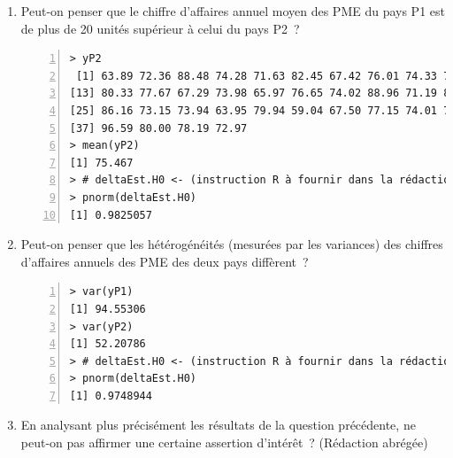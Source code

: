 \documentclass[10pt]{report}
\begin{document}
\begin{exercice}
\begin{enumerate}
\item Peut-on penser que le chiffre d'affaires annuel moyen des PME du pays P1 est de plus de 20 unités supérieur à celui du pays P2~?

\IndicR
\begin{Verbatim}[frame=leftline,fontfamily=tt,fontshape=n,numbers=left]
> yP2
 [1] 63.89 72.36 88.48 74.28 71.63 82.45 67.42 76.01 74.33 77.81 71.67 72.38
[13] 80.33 77.67 67.29 73.98 65.97 76.65 74.02 88.96 71.19 81.90 75.03 80.35
[25] 86.16 73.15 73.94 63.95 79.94 59.04 67.50 77.15 74.01 77.45 78.13 74.46
[37] 96.59 80.00 78.19 72.97
> mean(yP2)
[1] 75.467
> # deltaEst.H0 <- (instruction R à fournir dans la rédaction)
> pnorm(deltaEst.H0)
[1] 0.9825057
\end{Verbatim}

 




\item Peut-on penser que les hétérogénéités (mesurées par les variances) des chiffres d'affaires annuels des PME des deux pays diffèrent~?

\IndicR
 \begin{Verbatim}[frame=leftline,fontfamily=tt,fontshape=n,numbers=left]
> var(yP1)
[1] 94.55306
> var(yP2)
[1] 52.20786
> # deltaEst.H0 <- (instruction R à fournir dans la rédaction)
> pnorm(deltaEst.H0)
[1] 0.9748944
\end{Verbatim}





\item En analysant plus précisément les résultats de la question précédente, ne peut-on pas affirmer une certaine assertion d'intérêt~? (Rédaction abrégée)





\end{enumerate}
\end{exercice}
\end{document}
